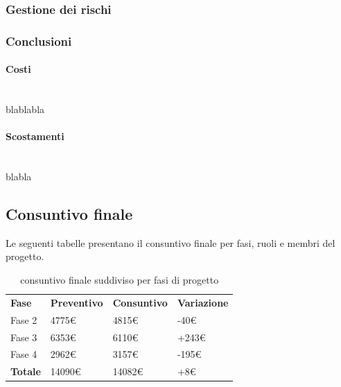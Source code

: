 	
\subsubsection{Gestione dei rischi}

\subsubsection{Conclusioni}

\paragraph{Costi\\}\noindent\\
blablabla
\paragraph{Scostamenti\\}\noindent \\
blabla	
	
\newpage
\subsection{Consuntivo finale}
Le seguenti tabelle presentano il consuntivo finale per fasi, ruoli e membri del progetto.

\begin{table}[H]
			\centering
		\begin{tabular}{| l | l | l | l |}
			\rowcolor{LightBlue}
			\textbf{\color{white}Fase}
			& \textbf{\color{white}Preventivo}
			& \textbf{\color{white}Consuntivo}
			& \textbf{\color{white}Variazione}
			\\
			
			Fase 2 			& 4775€ 	& 4815€ & -40€\\
			Fase 3 		& 6353€ 	& 6110€ & +243€\\
			Fase 4			& 2962€ 	& 3157€ & -195€ \\
			\textbf{Totale} & 14090€ & 14082€ & +8€\\ \hline
		\end{tabular}
		\caption{consuntivo finale suddiviso per fasi di progetto}	
\end{table}

